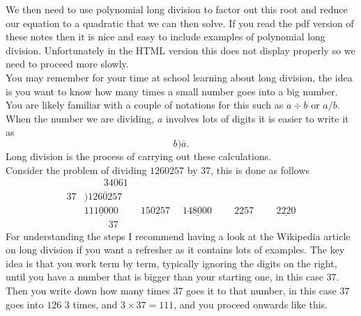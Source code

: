 \begin{warpHTML}
We then need to use polynomial long division to factor out this root and reduce our equation to a quadratic that we can then solve. If you read the pdf version of these notes then it is nice and easy to include examples of polynomial long division. Unfortunately in the HTML version this does not display properly so we need to proceed more slowly.\\

You may remember for your time at school learning about long division, the idea is you want to know how many times a small number goes into a big number. You are likely familiar with a couple of notations for this such as $a\div b$ or $a/b$.  When the number we are dividing, $a$ involves lots of digits it is easier to write it as
\begin{equation*}
b)\overline{a}.
\end{equation*}
Long division is the process of carrying out these calculations.\\

Consider the problem of dividing $1260257$ by 37, this is done as follows
\begin{align*}
& \phantom{++}34061\\
37&)\overline{1260257}\\
&\underline{1110000}
&\phantom{1}150257
&\phantom{1}\underline{148000}
&\phantom{111}2257
&\phantom{111}\underline{2220}\\
&\phantom{11111}37
\end{align*}
For understanding the steps I recommend having a look at the Wikipedia article on long division if you want a refresher as it contains lots of examples. The key idea is that you work term by term, typically ignoring the digits on the right, until you have a number that is bigger than your starting one, in this case $37$. Then you write down how many times 37 goes it to that number, in this case $37$ goes into $126$ $3$ times, and $3\times 37=111$, and you proceed onwards like this.\\


\end{warpHTML}
